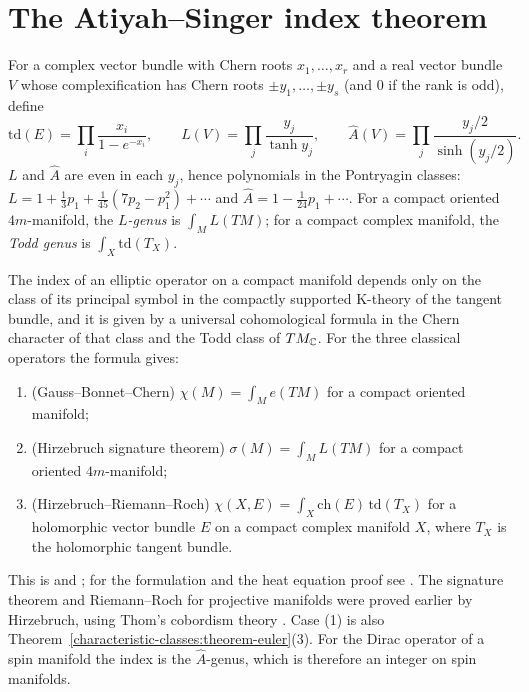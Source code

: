 \section{The Atiyah--Singer index theorem}\label{index-theorems:section-atiyah-singer}

\begin{definition}\label{index-theorems:definition-genera}
For a complex vector bundle with Chern roots $x_1, \ldots, x_r$ and a real vector bundle $V$ whose complexification has Chern roots $\pm y_1, \ldots, \pm y_s$ (and $0$ if the rank is odd), define
\[
\mathrm{td}(E) = \prod_i\frac{x_i}{1 - e^{-x_i}}, \qquad L(V) = \prod_j\frac{y_j}{\tanh y_j}, \qquad \hat A(V) = \prod_j\frac{y_j/2}{\sinh(y_j/2)}.
\]
$L$ and $\hat A$ are even in each $y_j$, hence polynomials in the Pontryagin classes: $L = 1 + \frac13p_1 + \frac{1}{45}(7p_2 - p_1^2) + \cdots$ and $\hat A = 1 - \frac{1}{24}p_1 + \cdots$. For a compact oriented $4m$-manifold, the
\emph{$L$-genus} is $\int_ML(TM)$; for a compact complex manifold, the \emph{Todd genus} is $\int_X\mathrm{td}(T_X)$.
\end{definition}

\begin{theorem}\label{index-theorems:theorem-atiyah-singer}
The index of an elliptic operator on a compact manifold depends only on the class of its principal symbol in the compactly supported K-theory of the tangent bundle, and it is given by a universal cohomological formula in
the Chern character of that class and the Todd class of $TM_{\mathbb{C}}$. For the three classical operators the formula gives:
\begin{enumerate}
\item (Gauss--Bonnet--Chern) $\chi(M) = \int_Me(TM)$ for a compact oriented manifold;
\item (Hirzebruch signature theorem) $\sigma(M) = \int_ML(TM)$ for a compact oriented $4m$-manifold;
\item (Hirzebruch--Riemann--Roch) $\chi(X, E) = \int_X\mathrm{ch}(E)\,\mathrm{td}(T_X)$ for a holomorphic vector bundle $E$ on a compact complex manifold $X$, where $T_X$ is the holomorphic tangent bundle.
\end{enumerate}
\end{theorem}

This is \cite{atiyah-singer-1968-1} and \cite{atiyah-singer-1968-3}; for the formulation and the heat equation proof see \cite{lawson-michelsohn}. The signature theorem and Riemann--Roch for projective manifolds were proved
earlier by Hirzebruch, using Thom's cobordism theory \cite{hirzebruch-topological}. Case (1) is also Theorem~\ref{characteristic-classes:theorem-euler}(3). For the Dirac operator of a spin manifold the index is the
$\hat A$-genus, which is therefore an integer on spin manifolds.

